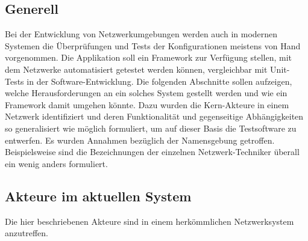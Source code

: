 \documentclass[
	ngerman,
	toc=listof, %
	toc=bibliography, %
	footnotes=multiple, %
	parskip=half, %
	numbers=noendperiod %
]{scrartcl}
\begin{document}
	\subsection{Generell}
		Bei der Entwicklung von Netzwerkumgebungen werden auch in modernen Systemen die Überprüfungen und Tests der Konfigurationen meistens von Hand vorgenommen.
		Die Applikation soll ein Framework zur Verfügung stellen, mit dem Netzwerke automatisiert getestet werden können, vergleichbar mit Unit-Tests in der Software-Entwicklung.
		Die folgenden Abschnitte sollen aufzeigen, welche Herausforderungen an ein solches System gestellt werden und wie ein Framework damit umgehen könnte.
		Dazu wurden die Kern-Akteure in einem Netzwerk identifiziert und deren Funktionalität und gegenseitige Abhängigkeiten so generalisiert wie möglich formuliert, um auf dieser Basis die Testsoftware zu entwerfen.
		Es wurden Annahmen bezüglich der Namensgebung getroffen. Beispielsweise sind die Bezeichnungen der einzelnen Netzwerk-Techniker überall ein wenig anders formuliert.
		\newpage

	\subsection{Akteure im aktuellen System}
	\label{sec:Akteure}
	Die hier beschriebenen Akteure sind in einem herkömmlichen Netzwerksystem anzutreffen. 
		
\end{document}
